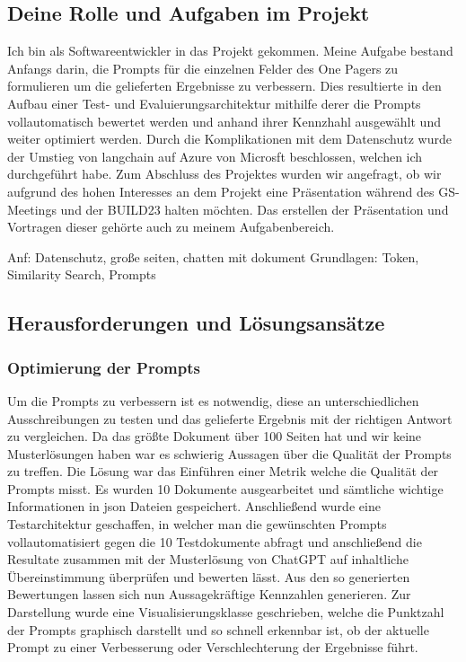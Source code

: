 \subsection{Deine Rolle und Aufgaben im Projekt}
Ich bin als Softwareentwickler in das Projekt gekommen. Meine Aufgabe bestand Anfangs darin, die Prompts für die einzelnen Felder des One Pagers zu formulieren um die gelieferten Ergebnisse zu verbessern. Dies resultierte in den Aufbau einer Test- und Evaluierungsarchitektur mithilfe derer die Prompts vollautomatisch bewertet werden und anhand ihrer Kennzhahl ausgewählt und weiter optimiert werden. Durch die Komplikationen mit dem Datenschutz wurde der Umstieg von langchain auf Azure von Microsft beschlossen, welchen ich durchgeführt habe. Zum Abschluss des Projektes wurden wir angefragt, ob wir aufgrund des hohen Interesses an dem Projekt eine Präsentation während des GS-Meetings und der BUILD23 halten möchten. Das erstellen der Präsentation und Vortragen dieser gehörte auch zu meinem Aufgabenbereich.

Anf: Datenschutz, große seiten, chatten mit dokument
Grundlagen: Token, Similarity Search, Prompts
\subsection{Herausforderungen und Lösungsansätze}

\subsubsection{Optimierung der Prompts}
Um die Prompts zu verbessern ist es notwendig, diese an unterschiedlichen Ausschreibungen zu testen und das gelieferte Ergebnis mit der richtigen Antwort zu vergleichen. Da das größte Dokument über 100 Seiten hat und wir keine Musterlösungen haben war es schwierig Aussagen über die Qualität der Prompts zu treffen. Die Lösung war das Einführen einer Metrik welche die Qualität der Prompts misst. Es wurden 10 Dokumente ausgearbeitet und sämtliche wichtige Informationen in json Dateien gespeichert. Anschließend wurde eine Testarchitektur geschaffen, in welcher man die gewünschten Prompts vollautomatisiert gegen die 10 Testdokumente abfragt und anschließend die Resultate zusammen mit der Musterlösung von ChatGPT auf inhaltliche Übereinstimmung überprüfen und bewerten lässt. Aus den so generierten Bewertungen lassen sich nun Aussagekräftige Kennzahlen generieren. Zur Darstellung wurde eine Visualisierungsklasse geschrieben, welche die Punktzahl der Prompts graphisch darstellt und so schnell erkennbar ist, ob der aktuelle Prompt zu einer Verbesserung oder Verschlechterung der Ergebnisse führt.

